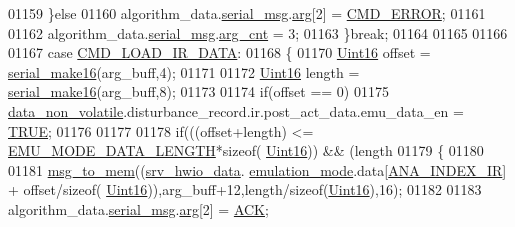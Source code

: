 \begin{DoxyCode}
{{{{{01159                          \}\textcolor{keywordflow}{else}
01160                              algorithm\_data.\hyperlink{a00016_afcf5f557aea688aad985eec15269c1da}{serial\_msg}.\hyperlink{a00031_af7d6f762438c80072bd9dc0e4dd4ae1e}{arg}[2] = 
      \hyperlink{a00021_a1764a522e9c1a59a59be8757c69fa494}{CMD\_ERROR};
01161 
01162                              algorithm\_data.\hyperlink{a00016_afcf5f557aea688aad985eec15269c1da}{serial\_msg}.\hyperlink{a00031_a7b79f40e2eeec288091afd340bf8f591}{arg\_cnt} = 3;
01163                 \}\textcolor{keywordflow}{break};
01164 
01165 
01166 
01167                  \textcolor{keywordflow}{case}  \hyperlink{a00021_a8c7ce698ee79d20e30eb0ac08f0d9abc}{CMD\_LOAD\_IR\_DATA}:
01168                 \{
01170                     \hyperlink{a00072_a59a9f6be4562c327cbfb4f7e8e18f08b}{Uint16} offset = \hyperlink{a00031_abc17de32f14103a5be219df0d4ad9176}{serial\_make16}(arg\_buff,4);
01171 
01172                     \hyperlink{a00072_a59a9f6be4562c327cbfb4f7e8e18f08b}{Uint16} length = \hyperlink{a00031_abc17de32f14103a5be219df0d4ad9176}{serial\_make16}(arg\_buff,8);
01173 
01174                     \textcolor{keywordflow}{if}(offset == 0)
01175                         \hyperlink{a00060_a76ac5f917f5308dcd83de0d7c94559fb}{data\_non\_volatile}.disturbance\_record.ir.post\_act\_data.emu\_data\_en 
      = \hyperlink{a00040_aa8cecfc5c5c054d2875c03e77b7be15d}{TRUE};
01176                     
01177 
01178                      \textcolor{keywordflow}{if}(((offset+length) <= \hyperlink{a00022_af4c3a8ad94feb4d7bda7f107f34baf41}{EMU\_MODE\_DATA\_LENGTH}*\textcolor{keyword}{sizeof}(
      \hyperlink{a00072_a59a9f6be4562c327cbfb4f7e8e18f08b}{Uint16})) && (length%
01179                       \{
01180 
01181                        \hyperlink{a00038_a126f3d78a95341a19a3e862e57357952}{msg\_to\_mem}((\hyperlink{a00034_a0fd91014631926f362c7c2b2f5d143b0}{srv\_hwio\_data}.
      \hyperlink{a00034_a742dceaef1f19ec73ed5acc066127476}{emulation\_mode}.data[\hyperlink{a00058_a1fae4d2e8dd35f504ec4170044da7e73}{ANA\_INDEX\_IR}] + offset/\textcolor{keyword}{sizeof}(
      \hyperlink{a00072_a59a9f6be4562c327cbfb4f7e8e18f08b}{Uint16})),arg\_buff+12,length/\textcolor{keyword}{sizeof}(\hyperlink{a00072_a59a9f6be4562c327cbfb4f7e8e18f08b}{Uint16}),16);
01182 
01183                          algorithm\_data.\hyperlink{a00016_afcf5f557aea688aad985eec15269c1da}{serial\_msg}.\hyperlink{a00031_af7d6f762438c80072bd9dc0e4dd4ae1e}{arg}[2] = \hyperlink{a00021_a6f6489887e08bff4887d0bc5dcf214d8}{ACK};
}}}}}
\end{DoxyCode}
